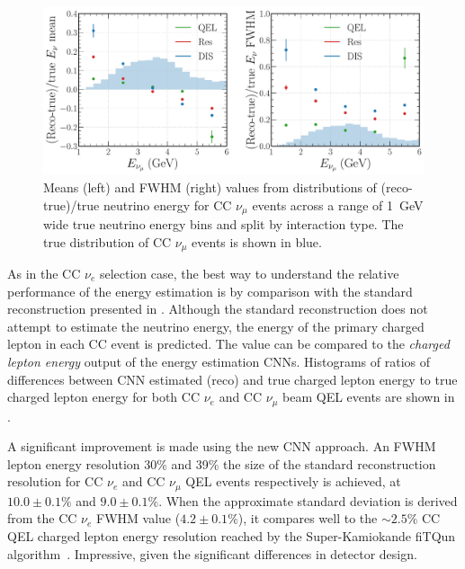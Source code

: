 \begin{figure} %
    \includegraphics[width=\textwidth]{diagrams/7-results/final_energy_numu.pdf}
    \caption[Means and FWHM values of $\nu_{\mu}$ energy distributions]
    {Means (left) and FWHM (right) values from distributions of (reco-true)/true neutrino energy
        for CC $\nu_{\mu}$ events across a range of \SI{1}{GeV} wide true neutrino energy bins and
        split by interaction type. The true distribution of CC $\nu_{\mu}$ events is shown in
        blue.}
    \label{fig:final_energy_numu}
\end{figure}

As in the CC $\nu_{e}$ selection case, the best way to understand the relative performance of the
energy estimation is by comparison with the standard \chips reconstruction presented in
. Although the standard reconstruction does not attempt to estimate
the neutrino energy, the energy of the primary charged lepton in each CC event is predicted. The
value can be compared to the \emph{charged lepton energy} output of the energy estimation CNNs.
Histograms of ratios of differences between CNN estimated (reco) and true charged lepton energy to
true charged lepton energy for both CC $\nu_{e}$ and CC $\nu_{\mu}$ beam QEL events are shown in
.

A significant improvement is made using the new CNN approach. An FWHM lepton energy resolution
30\% and 39\% the size of the standard reconstruction resolution for CC $\nu_{e}$ and CC
$\nu_{\mu}$ QEL events respectively is achieved, at $10.0\pm0.1\%$ and $9.0\pm0.1\%$. When the
approximate standard deviation is derived from the CC $\nu_{e}$ FWHM value ($4.2\pm0.1\%$), it
compares well to the $\sim2.5\%$ CC QEL charged lepton energy resolution reached by the
Super-Kamiokande fiTQun algorithm~\cite{jiang2019}. Impressive, given the significant differences
in detector design.

